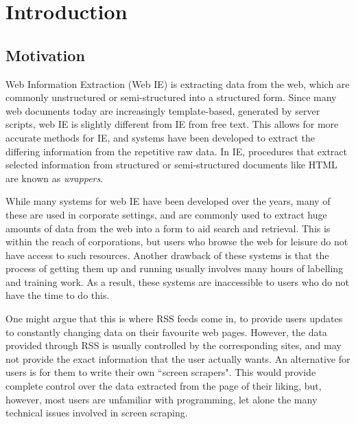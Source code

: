 \chapter{Introduction}

\section{Motivation}
Web Information Extraction (Web IE) is extracting data from the web,
which are commonly unstructured or semi-structured into a structured form.
Since many web documents today are increasingly template-based, generated by server scripts,
 web IE is slightly different from IE
from free text. This allows for more accurate methods for IE, and systems have been developed
to extract the differing information from the repetitive raw data.
In IE, procedures that extract selected information from structured or semi-structured
documents like HTML are known as \textit{wrappers}.

While many systems for web IE have been developed over the years, many of
these are used in corporate settings, and are commonly used to extract huge amounts of data from the web
into a form to aid search and retrieval. This is within the reach of
corporations, but users who browse the web for leisure do not have access to such resources.
Another drawback of these systems is that the process of getting them up and running usually
involves many hours of labelling and training work. As a result, these systems are inaccessible
to users who do not have the time to do this. 

One might argue that this is where RSS feeds come in, to provide users updates to constantly
changing data on their favourite web pages. However, the data provided through RSS is usually controlled by the
corresponding sites, and may not provide the exact information that the user actually wants. An
alternative for users is for them to write their own ``screen scrapers". This would provide
complete control over the data extracted from the page of their liking, but, however,
most users are unfamiliar with programming, let alone the many
technical issues involved in screen scraping.


